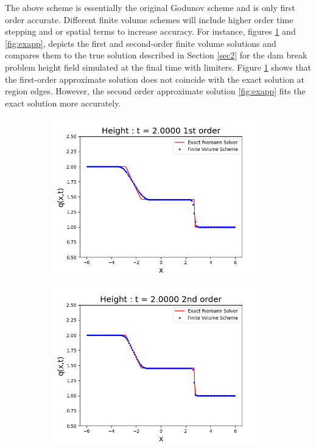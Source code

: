 \documentclass[10pt,a4paper]{article}
\begin{document}
The above  scheme is essentially the original Godunov scheme \cite{godunov1959difference} and is only first order accurate.  Different finite volume schemes will include higher order time stepping and or spatial terms to increase accuracy.  For instance, figures \ref{fig:exap} and \ref{fig:exapp}, depicts the first and second-order finite volume solutions and compares them to the true solution described in Section \ref{sec2} for the dam break problem height field simulated at the final time with limiters. Figure \ref{fig:exap}  shows that the first-order approximate solution does not coincide with the exact solution at region edges. However, the second order approximate solution \ref{fig:exapp}  fits the exact solution more accurately. 
	\begin{figure}[H]
		\begin{subfigure}[b]{0.5\textwidth}
			\centering
			\includegraphics[width=1.0\linewidth]{images/exap}
			\caption{}
			\label{fig:exap}
		\end{subfigure}
		\begin{subfigure}[b]{0.5\textwidth}
			\centering
			\includegraphics[width=1.0\linewidth]{images/exapp}

\end{subfigure}
\end{figure}
\end{document}
